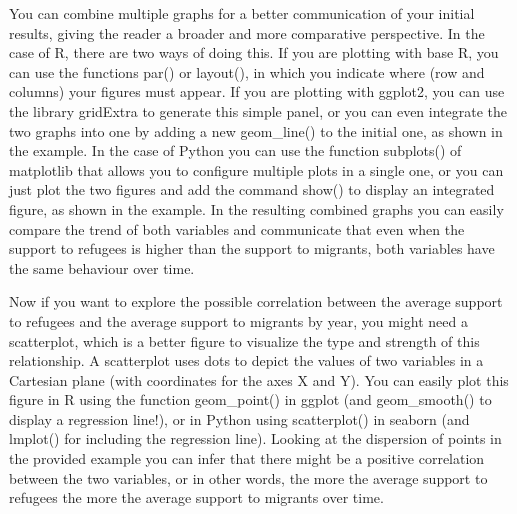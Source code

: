 
You can combine multiple graphs for a better communication of your initial results, giving the reader a broader and more comparative perspective. In the case of R, there are two ways of doing this. If you are plotting with base R, you can use the functions par() or layout(), in which you indicate where (row and columns) your figures must appear. If you are plotting with ggplot2, you can use the library gridExtra to generate this simple panel, or you can even integrate the two graphs into one by adding a new geom\_line() to the initial one, as shown in the example. In the case of Python you can use the function subplots() of matplotlib that allows you to configure multiple plots in a single one, or you can just plot the two figures and add the command show() to display an integrated figure, as shown in the example.  In the resulting combined graphs you can easily compare the trend of both variables and communicate that even when the support to refugees is higher than the support to migrants, both variables have the same behaviour over time.


Now if you want to explore the possible correlation between the average support to refugees and the average support to migrants by year, you might need a scatterplot, which is a better figure to visualize the type and strength of this relationship. A scatterplot uses dots to depict the values of two variables in a Cartesian plane (with coordinates for the axes X and Y). You can easily plot this figure in R using the function geom\_point() in ggplot (and geom\_smooth() to display a regression line!), or in Python using scatterplot() in seaborn (and lmplot() for including the regression line). Looking at the dispersion of points in the provided example you can infer that there might be a positive correlation between the two variables, or in other words, the more the average support to refugees the more the average support to migrants over time.


